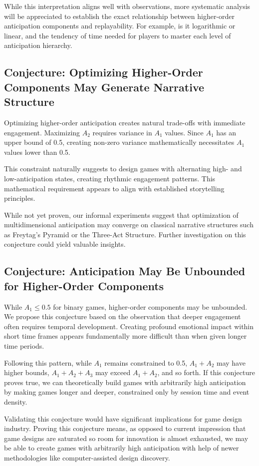 \documentclass[manuscript,review,anonymous]{acmart}
\theoremstyle{definition}
\theoremstyle{plain}
\begin{document}
While this interpretation aligns well with observations, more systematic analysis will be appreciated to establish the exact relationship between higher-order anticipation components and replayability.
For example, is it logarithmic or linear, and the tendency of time needed for players to master each level of anticipation hierarchy.

\subsection{Conjecture: Optimizing Higher-Order Components May Generate Narrative Structure}
Optimizing higher-order anticipation creates natural trade-offs with immediate engagement.
Maximizing $A_2$ requires variance in $A_1$ values.
Since $A_1$ has an upper bound of 0.5, creating non-zero variance mathematically necessitates $A_1$ values lower than 0.5.

This constraint naturally suggests to design games with alternating high- and low-anticipation states, creating rhythmic engagement patterns.
This mathematical requirement appears to align with established storytelling principles.

While not yet proven, our informal experiments suggest that optimization of multidimensional anticipation may converge on classical narrative structures such as Freytag's Pyramid or the Three-Act Structure.
Further investigation on this conjecture could yield valuable insights.

\subsection{Conjecture: Anticipation May Be Unbounded for Higher-Order Components}
While $A_1 \leq 0.5$ for binary games, higher-order components may be unbounded.
We propose this conjecture based on the observation that deeper engagement often requires temporal development.
Creating profound emotional impact within short time frames appears fundamentally more difficult than when given longer time periods.

Following this pattern, while $A_1$ remains constrained to 0.5, $A_1+A_2$ may have higher bounds, $A_1+A_2+A_3$ may exceed $A_1+A_2$, and so forth.
If this conjecture proves true, we can theoretically build games with arbitrarily high anticipation by making games longer and deeper, constrained only by session time and event density.

Validating this conjecture would have significant implications for game design industry.
Proving this conjecture means, as opposed to current impression that game designs are saturated so room for innovation is almost exhausted, we may be able to create games with arbitrarily high anticipation with help of newer methodologies like computer-assisted design discovery.
\end{document}
